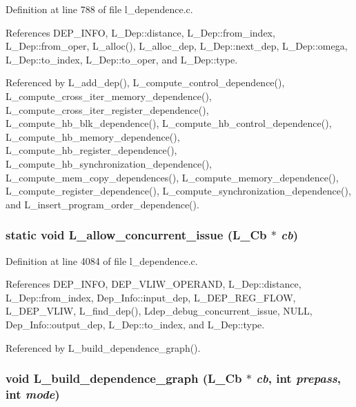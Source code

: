 Definition at line 788 of file l\_\-dependence.c.

References DEP\_\-INFO, L\_\-Dep::distance, L\_\-Dep::from\_\-index, L\_\-Dep::from\_\-oper, L\_\-alloc(), L\_\-alloc\_\-dep, L\_\-Dep::next\_\-dep, L\_\-Dep::omega, L\_\-Dep::to\_\-index, L\_\-Dep::to\_\-oper, and L\_\-Dep::type.

Referenced by L\_\-add\_\-dep(), L\_\-compute\_\-control\_\-dependence(), L\_\-compute\_\-cross\_\-iter\_\-memory\_\-dependence(), L\_\-compute\_\-cross\_\-iter\_\-register\_\-dependence(), L\_\-compute\_\-hb\_\-blk\_\-dependence(), L\_\-compute\_\-hb\_\-control\_\-dependence(), L\_\-compute\_\-hb\_\-memory\_\-dependence(), L\_\-compute\_\-hb\_\-register\_\-dependence(), L\_\-compute\_\-hb\_\-synchronization\_\-dependence(), L\_\-compute\_\-mem\_\-copy\_\-dependences(), L\_\-compute\_\-memory\_\-dependence(), L\_\-compute\_\-register\_\-dependence(), L\_\-compute\_\-synchronization\_\-dependence(), and L\_\-insert\_\-program\_\-order\_\-dependence().
\subsubsection{\setlength{\rightskip}{0pt plus 5cm}static void L\_\-allow\_\-concurrent\_\-issue (L\_\-Cb $\ast$ {\em cb})\hspace{0.3cm}{\tt  [static]}}\label{l__dependence_8c_ddfb04cbdf5e137545d118b72af1702a}




Definition at line 4084 of file l\_\-dependence.c.

References DEP\_\-INFO, DEP\_\-VLIW\_\-OPERAND, L\_\-Dep::distance, L\_\-Dep::from\_\-index, Dep\_\-Info::input\_\-dep, L\_\-DEP\_\-REG\_\-FLOW, L\_\-DEP\_\-VLIW, L\_\-find\_\-dep(), Ldep\_\-debug\_\-concurrent\_\-issue, NULL, Dep\_\-Info::output\_\-dep, L\_\-Dep::to\_\-index, and L\_\-Dep::type.

Referenced by L\_\-build\_\-dependence\_\-graph().
\subsubsection{\setlength{\rightskip}{0pt plus 5cm}void L\_\-build\_\-dependence\_\-graph (L\_\-Cb $\ast$ {\em cb}, int {\em prepass}, int {\em mode})}\label{l__dependence_8c_68d25f7aa698c6f1e9f8205eeda8173c}





